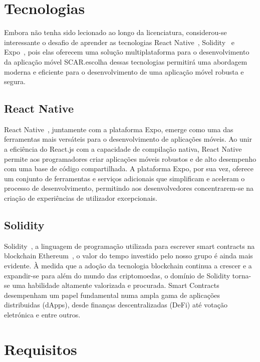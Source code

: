 \documentclass[10pt]{article}
\begin{document}
\section*{Tecnologias}

Embora não tenha sido lecionado ao longo da licenciatura, considerou-se interessante o desafio de aprender
as tecnologias React Native~\cite{ReactNativeBook}, Solidity~\cite{SolidityBook} e Expo~\cite{Expo}, pois elas oferecem uma solução multiplataforma para o
desenvolvimento da aplicação móvel SCAR.\@A escolha dessas tecnologias permitirá uma abordagem moderna e
eficiente para o desenvolvimento de uma aplicação móvel robusta e segura.

\subsection*{React Native}

React Native~\cite{ReactNativeDocs}, juntamente com a plataforma Expo, emerge como uma das ferramentas mais versáteis
para o desenvolvimento de aplicações móveis. Ao unir a eficiência do React.js com a capacidade de compilação
nativa, React Native permite aos programadores criar aplicações móveis robustos e de alto desempenho
com uma base de código compartilhada. A plataforma Expo, por sua vez, oferece um conjunto de ferramentas
e serviços adicionais que simplificam e aceleram o processo de desenvolvimento, permitindo aos desenvolvedores
concentrarem-se na criação de experiências de utilizador excepcionais.

\subsection*{Solidity}

Solidity~\cite{SolidityDocs}, a linguagem de programação utilizada para escrever smart contracts na blockchain Ethereum~\cite{Ethereum},
o valor do tempo investido pelo nosso grupo é ainda mais evidente. À medida que a adoção da tecnologia
blockchain continua a crescer e a expandir-se para além do mundo das criptomoedas, o domínio de Solidity torna-se
uma habilidade altamente valorizada e procurada. Smart Contracts desempenham um papel fundamental numa
ampla gama de aplicações distribuidas (dApps), desde finanças descentralizadas (DeFi) até votação eletrónica
e entre outros.

\section{Requisitos}
\end{document}

